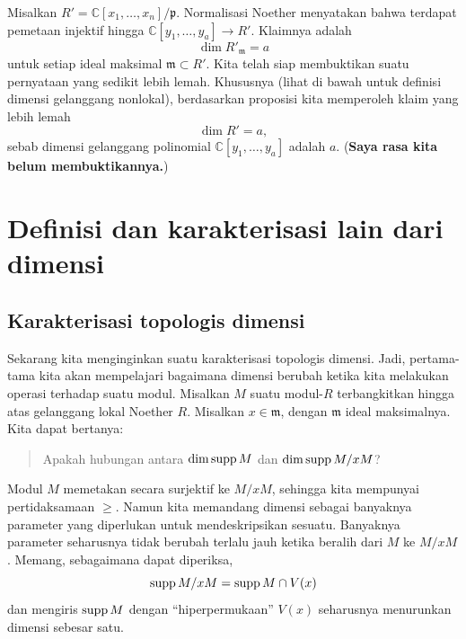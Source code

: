 \begin{example} 
Misalkan $R' = \mathbb{C}[x_1, \dots, x_n]/\mathfrak{p}$. Normalisasi Noether menyatakan
bahwa terdapat pemetaan injektif hingga $\mathbb{C}[y_1, \dots, y_a] \to R'$.
Klaimnya adalah
\[ \dim R'_{\mathfrak{m}} =a  \]
untuk setiap ideal maksimal $\mathfrak{m} \subset R'$. Kita telah siap membuktikan suatu
pernyataan yang sedikit lebih lemah. Khususnya (lihat di bawah untuk definisi
dimensi gelanggang nonlokal), berdasarkan proposisi kita
memperoleh klaim yang lebih lemah
\[ \dim R' = a,  \]
sebab dimensi gelanggang polinomial $\mathbb{C}[y_1, \dots, y_a]$ adalah $a$.
(\textbf{Saya rasa kita belum membuktikannya.})
\end{example} 



\section{Definisi dan karakterisasi lain dari dimensi}

\subsection{Karakterisasi topologis dimensi} Sekarang kita menginginkan suatu karakterisasi topologis
dimensi. Jadi, pertama-tama kita akan mempelajari bagaimana dimensi
berubah ketika kita melakukan operasi terhadap suatu modul. Misalkan $M$ suatu modul-$R$ terbangkitkan hingga atas gelanggang lokal
Noether $R$. Misalkan $x \in \mathfrak{m}$, dengan $\mathfrak{m}$ ideal
maksimalnya.
Kita dapat bertanya:
\begin{quote}
Apakah hubungan antara $\mathrm{dim} \operatorname{supp} M$ dan $\mathrm{dim} \operatorname{supp} M/xM$?
\end{quote}
Modul $M$ memetakan secara surjektif ke $M/xM$, sehingga kita mempunyai pertidaksamaan $\geq$. Namun kita memandang
dimensi sebagai banyaknya parameter yang diperlukan untuk mendeskripsikan
sesuatu. Banyaknya parameter seharusnya tidak berubah terlalu jauh ketika beralih dari
$M$ ke $M/xM$. Memang, sebagaimana dapat diperiksa,
\[ \operatorname{supp} M/xM = \operatorname{supp} M \cap V(x)  \]
dan mengiris $\operatorname{supp} M$ dengan ``hiperpermukaan'' $V(x)$ seharusnya menurunkan
dimensi sebesar satu. 


